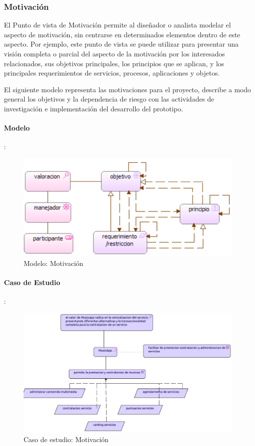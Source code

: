 \newpage

\subsubsection{Motivación}
El Punto de vista de Motivación permite al diseñador o analista modelar el aspecto de motivación, sin centrarse en determinados elementos dentro de este aspecto. Por ejemplo, este punto de vista se puede utilizar para presentar una visión completa o parcial del aspecto de la motivación por los interesados relacionados, sus objetivos principales, los principios que se aplican, y los principales requerimientos de servicios, procesos, aplicaciones y objetos.  \vspace{\baselineskip}

El siguiente modelo representa las motivaciones para el proyecto, describe a modo general los objetivos y la dependencia de riesgo con las actividades de investigación e implementación del desarrollo del prototipo.

\paragraph{Modelo}:
\begin{figure}[h!]
	\centering
	\includegraphics[width=0.8\linewidth]{Desarrollo/ArquitecturaEmpresarial/Motivacion/imgs/MotivacionMetamodelo.PNG}
	\caption{Modelo:  Motivación}
\end{figure}
\newpage
\paragraph{Caso de Estudio}:
\begin{figure}[h!]
	\centering
	\includegraphics[width=\linewidth]{Desarrollo/ArquitecturaEmpresarial/Motivacion/imgs/Motivacion.pdf}
	\caption{Caso de estudio: Motivación}
\end{figure}

\newpage

